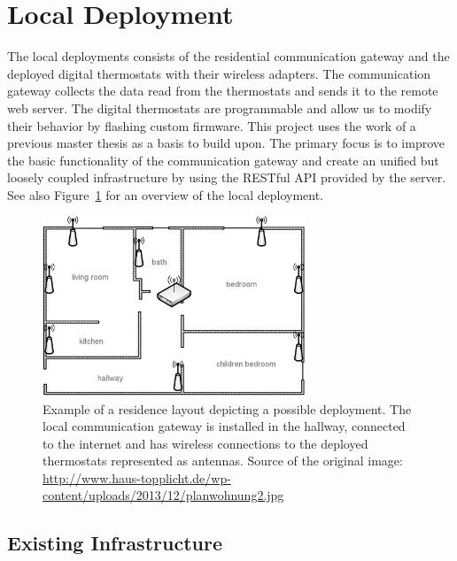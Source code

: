 
\section{Local Deployment}
\label{sec:local_infrastructure}

The local deployments consists of the residential communication gateway and the deployed digital thermostats with their wireless adapters.
The communication gateway collects the data read from the thermostats and sends it to the remote web server.
The digital thermostats are programmable and allow us to modify their behavior by flashing custom firmware.
This project uses the work of a previous master thesis as a basis to build upon\cite{eigenmann2012opportunisticSensing}.
The primary focus is to improve the basic functionality of the communication gateway and create an unified but loosely coupled infrastructure by using the RESTful API provided by the server.
See also Figure~\ref{fig:residence_layout} for an overview of the local deployment.

\begin{figure}[h]
	\begin{center}
		\includegraphics[width=0.7\textwidth]{images/residence_layout_schema.png}
	\end{center}
	\caption{Example of a residence layout depicting a possible deployment. The local communication gateway is installed in the hallway, connected to the internet and has wireless connections to the deployed thermostats represented as antennas. Source of the original image: \url{http://www.haus-topplicht.de/wp-content/uploads/2013/12/planwohnung2.jpg}}
	\label{fig:residence_layout}
\end{figure}

\subsection{Existing Infrastructure}

